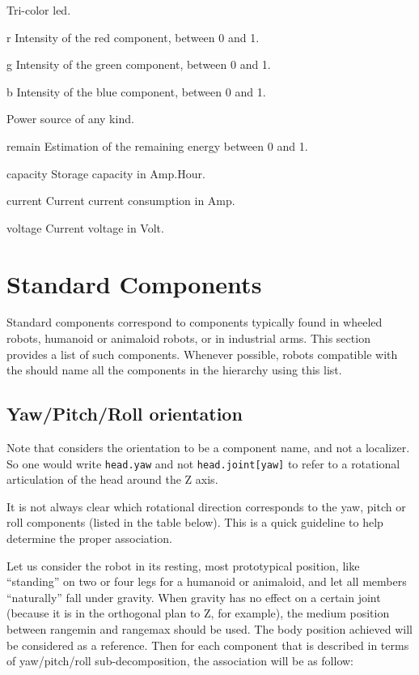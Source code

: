 
Tri-color led.

\begin{urbiscriptapi}
\item[r] Intensity of the red component, between 0 and 1.
\item[g] Intensity of the green component, between 0 and 1.
\item[b] Intensity of the blue component, between 0 and 1.
\end{urbiscriptapi}


Power source of any kind.

\begin{urbiscriptapi}
\item[remain] Estimation of the remaining energy between 0 and 1.
\item[capacity] Storage capacity in Amp.Hour.
\item[current] Current current consumption in Amp.
\item[voltage] Current voltage in Volt.
\end{urbiscriptapi}


\section{Standard Components}

Standard components correspond to components typically found in wheeled
robots, humanoid or animaloid robots, or in industrial arms. This section
provides a list of such components. Whenever possible, robots compatible with
the \gsrapi should name all the components in the hierarchy using this list.

\subsection{Yaw/Pitch/Roll orientation}
\label{sec:naming:ypr}

Note that \gsrapi considers the orientation to be a component name, and
not a localizer. So one would write \lstinline|head.yaw| and not
\lstinline|head.joint[yaw]| to refer to a rotational articulation of the head
around the Z axis.

It is not always clear which rotational direction corresponds to the
yaw, pitch or roll components (listed in the table below). This is a
quick guideline to help determine the proper association.

Let us consider the robot in its resting, most prototypical position,
like ``standing'' on two or four legs for a humanoid or animaloid, and
let all members ``naturally'' fall under gravity. When gravity has no
effect on a certain joint (because it is in the orthogonal plan to Z,
for example), the medium position between rangemin and rangemax should
be used. The body position achieved will be considered as a reference.
Then for each component that is described in terms of yaw/pitch/roll
sub-decomposition, the association will be as follow:

